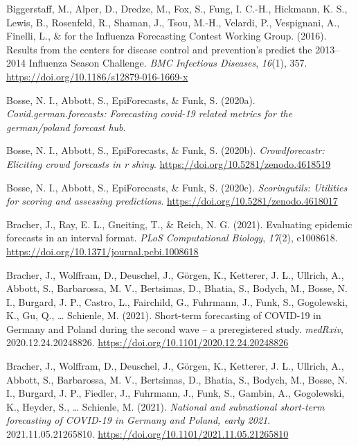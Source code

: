 \documentclass[
]{article}
\newlength{\cslhangindent}
\newlength{\cslentryspacingunit} %
\newenvironment{CSLReferences}[2] %
 {%
  \setlength{\parindent}{0pt}
  \ifodd #1
  \let\oldpar\par
  \def\par{\hangindent=\cslhangindent\oldpar}
  \fi
  \setlength{\parskip}{#2\cslentryspacingunit}
 }%
 {}
\begin{document}
\begin{CSLReferences}{1}{0}
\leavevmode{}%
Biggerstaff, M., Alper, D., Dredze, M., Fox, S., Fung, I. C.-H., Hickmann, K. S., Lewis, B., Rosenfeld, R., Shaman, J., Tsou, M.-H., Velardi, P., Vespignani, A., Finelli, L., \& for the Influenza Forecasting Contest Working Group. (2016). Results from the centers for disease control and prevention's predict the 2013--2014 {Influenza Season Challenge}. \emph{BMC Infectious Diseases}, \emph{16}(1), 357. \url{https://doi.org/10.1186/s12879-016-1669-x}

\leavevmode{}%
Bosse, N. I., Abbott, S., EpiForecasts, \& Funk, S. (2020a). \emph{Covid.german.forecasts: Forecasting covid-19 related metrics for the german/poland forecast hub}.

\leavevmode{}%
Bosse, N. I., Abbott, S., EpiForecasts, \& Funk, S. (2020b). \emph{Crowdforecastr: Eliciting crowd forecasts in r shiny}. \url{https://doi.org/10.5281/zenodo.4618519}

\leavevmode{}%
Bosse, N. I., Abbott, S., EpiForecasts, \& Funk, S. (2020c). \emph{Scoringutils: Utilities for scoring and assessing predictions}. \url{https://doi.org/10.5281/zenodo.4618017}

\leavevmode{}%
Bracher, J., Ray, E. L., Gneiting, T., \& Reich, N. G. (2021). Evaluating epidemic forecasts in an interval format. \emph{PLoS Computational Biology}, \emph{17}(2), e1008618. \url{https://doi.org/10.1371/journal.pcbi.1008618}

\leavevmode{}%
Bracher, J., Wolffram, D., Deuschel, J., Görgen, K., Ketterer, J. L., Ullrich, A., Abbott, S., Barbarossa, M. V., Bertsimas, D., Bhatia, S., Bodych, M., Bosse, N. I., Burgard, J. P., Castro, L., Fairchild, G., Fuhrmann, J., Funk, S., Gogolewski, K., Gu, Q., \ldots{} Schienle, M. (2021). Short-term forecasting of {COVID}-19 in {Germany} and {Poland} during the second wave -- a preregistered study. \emph{medRxiv}, 2020.12.24.20248826. \url{https://doi.org/10.1101/2020.12.24.20248826}

\leavevmode{}%
Bracher, J., Wolffram, D., Deuschel, J., Görgen, K., Ketterer, J. L., Ullrich, A., Abbott, S., Barbarossa, M. V., Bertsimas, D., Bhatia, S., Bodych, M., Bosse, N. I., Burgard, J. P., Fiedler, J., Fuhrmann, J., Funk, S., Gambin, A., Gogolewski, K., Heyder, S., \ldots{} Schienle, M. (2021). \emph{National and subnational short-term forecasting of {COVID}-19 in {Germany} and {Poland}, early 2021}. 2021.11.05.21265810. \url{https://doi.org/10.1101/2021.11.05.21265810}


\end{CSLReferences}
\end{document}
